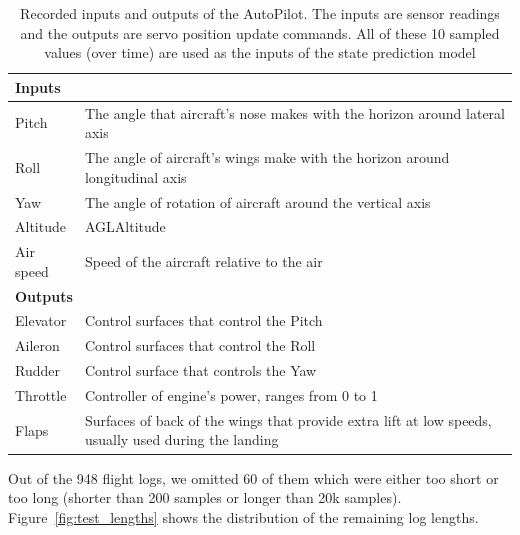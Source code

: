 \begin{table}[ht]
    \centering
    \begin{tabularx}{\columnwidth}{lX}
\toprule
\multicolumn{2}{l}{\textbf{Inputs}}                                                                              \\ \midrule
Pitch     & The angle that aircraft's nose makes with the horizon around lateral axis                            \\ 
Roll      & The angle of aircraft's wings make with the horizon around longitudinal axis                         \\ 
Yaw       & The angle of rotation of aircraft around the vertical axis                                           \\ 
Altitude  & AGL\footnotemark Altitude                                                            \\ 
Air speed & Speed of the aircraft relative to the air                                                            \\ 
\midrule
\multicolumn{2}{l}{\textbf{Outputs}}                                                                             \\ 
\midrule
Elevator  & Control surfaces that control the Pitch                                                              \\ 
Aileron   & Control surfaces that control the Roll                                                               \\ 
Rudder    & Control surface that controls the Yaw                                                                \\ 
Throttle  & Controller of engine's power, ranges from 0 to 1                                                     \\ 
Flaps     & Surfaces of back of the wings that provide extra lift at low speeds, usually used during the landing \\ \bottomrule
    \end{tabularx}
    \caption{Recorded inputs and outputs of the AutoPilot. The inputs are sensor readings and the outputs are servo position update commands. All of these 10 sampled values (over time) are used as the inputs of the state prediction model}
    \label{tab:in_outs}
\end{table}


Out of the 948 flight logs, we omitted 60 of them which were either too short or too long (shorter than 200 samples or longer than 20k samples). Figure~\ref{fig:test_lengths} shows the distribution of the remaining log lengths.

